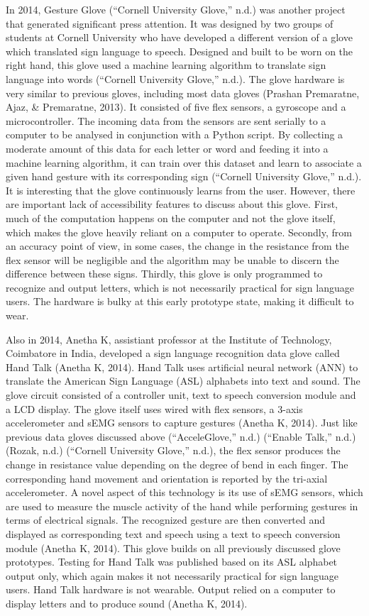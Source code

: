 In 2014, Gesture Glove (``Cornell University Glove,'' n.d.) was another project that generated significant press attention. It was designed by two groups of students at Cornell University who have developed a different version of a glove which translated sign language to speech. Designed and built to be worn on the right hand, this glove used a machine learning algorithm to translate sign language into words (``Cornell University Glove,'' n.d.). The glove hardware is very similar to previous gloves, including most data gloves (Prashan Premaratne, Ajaz, \& Premaratne, 2013). It consisted of five flex sensors, a gyroscope and a microcontroller. The incoming data from the sensors are sent serially to a computer to be analysed in conjunction with a Python script. By collecting a moderate amount of this data for each letter or word and feeding it into a machine learning algorithm, it can train over this dataset and learn to associate a given hand gesture with its corresponding sign (``Cornell University Glove,'' n.d.). It is interesting that the glove continuously learns from the user. However, there are important lack of accessibility features to discuss about this glove. First, much of the computation happens on the computer and not the glove itself, which makes the glove heavily reliant on a computer to operate. Secondly, from an accuracy point of view, in some cases, the change in the resistance from the flex sensor will be negligible and the algorithm may be unable to discern the difference between these signs. Thirdly, this glove is only programmed to recognize and output letters, which is not necessarily practical for sign language users. The hardware is bulky at this early prototype state, making it difficult to wear. 


Also in 2014, Anetha K, assistiant professor at the Institute of Technology, Coimbatore in India, developed a sign language recognition data glove called Hand Talk (Anetha K, 2014). Hand Talk uses artificial neural network (ANN) to translate the American Sign Language (ASL) alphabets into text and sound. The glove circuit consisted of a controller unit, text to speech conversion module and a LCD display. The glove itself uses wired with flex sensors, a 3-axis accelerometer and sEMG sensors to capture gestures (Anetha K, 2014). Just like previous data gloves discussed above (``AcceleGlove,'' n.d.) (``Enable Talk,'' n.d.) (Rozak, n.d.) (``Cornell University Glove,'' n.d.), the flex sensor produces the change in resistance value depending on the degree of bend in each finger. The corresponding hand movement and orientation is reported by the tri-axial accelerometer. A novel aspect of this technology is its use of sEMG sensors, which are used to measure the muscle activity of the hand while performing gestures in terms of electrical signals. The recognized gesture are then converted and displayed as corresponding text and speech using a text to speech conversion module (Anetha K, 2014).  This glove builds on all previously discussed glove prototypes. Testing for Hand Talk was published based on its ASL alphabet output only, which again makes it not necessarily practical for sign language users. Hand Talk hardware is not wearable. Output relied on a computer to display letters and to produce sound (Anetha K, 2014). 


